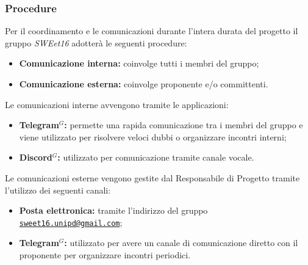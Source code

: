         \subsubsection{Procedure}


            Per il coordinamento e le comunicazioni durante l'intera durata del progetto il gruppo \textit{SWEet16} adotterà le seguenti procedure:
            \begin{itemize}
                \item \textbf{Comunicazione interna:} coinvolge tutti i membri del gruppo;
                \item \textbf{Comunicazione esterna:} coinvolge proponente e/o committenti.
            \end{itemize}


            Le comunicazioni interne avvengono tramite le applicazioni:
            \begin{itemize}
                \item \textbf{Telegram$^{G}$:} permette una rapida comunicazione tra i membri del gruppo e viene utilizzato per risolvere veloci dubbi o organizzare incontri interni;
                \item \textbf{Discord$^{G}$:} utilizzato per comunicazione tramite canale vocale.
            \end{itemize}


            Le comunicazioni esterne vengono gestite dal Responsabile di Progetto tramite l'utilizzo dei seguenti canali:
            \begin{itemize}
                \item \textbf{Posta elettronica:} tramite l'indirizzo del gruppo \href{mailto:sweet16.unipd@gmail.com}{\nolinkurl{sweet16.unipd@gmail.com}};
                \item \textbf{Telegram$^{G}$:} utilizzato per avere un canale di comunicazione diretto con il proponente per organizzare incontri periodici.
            \end{itemize}



